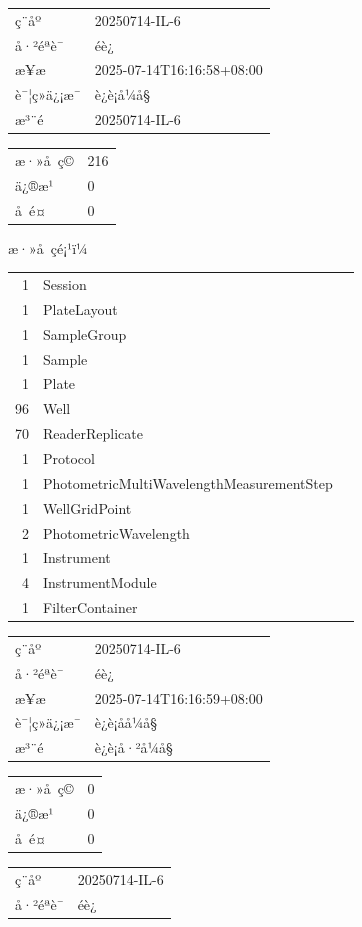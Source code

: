\documentclass[UTF8,10pt,a4paper,fontset=fandol]{ctexart}
\begin{document}
\begin{flushleft}
\scriptsize
\begin{tabular}{ll}
ç¨åº & 20250714-IL-6\\
å·²éªè¯ & éè¿\\
æ¥æ & 2025-07-14T16:16:58+08:00\\
è¯¦ç»ä¿¡æ¯ & è¿è¡å¼å§\\
æ³¨é & 20250714-IL-6
\end{tabular}

\vspace{0.5em}

\begin{tabular}{ll}
æ·»å ç© & 216\\
ä¿®æ¹ & 0\\
å é¤ & 0
\end{tabular}

\vspace{0.5em}

æ·»å çé¡¹ï¼
\begin{tabular}{rll}
1 & Session\\
1 & PlateLayout\\
1 & SampleGroup\\
1 & Sample\\
1 & Plate\\
96 & Well\\
70 & ReaderReplicate\\
1 & Protocol\\
1 & PhotometricMultiWavelengthMeasurementStep\\
1 & WellGridPoint\\
2 & PhotometricWavelength\\
1 & Instrument\\
4 & InstrumentModule\\
1 & FilterContainer
\end{tabular}

\vspace{0.8em}

\begin{tabular}{ll}
ç¨åº & 20250714-IL-6\\
å·²éªè¯ & éè¿\\
æ¥æ & 2025-07-14T16:16:59+08:00\\
è¯¦ç»ä¿¡æ¯ & è¿è¡åå¼å§\\
æ³¨é & è¿è¡å·²å¼å§
\end{tabular}

\vspace{0.5em}

\begin{tabular}{ll}
æ·»å ç© & 0\\
ä¿®æ¹ & 0\\
å é¤ & 0
\end{tabular}

\vspace{0.8em}

\begin{tabular}{ll}
ç¨åº & 20250714-IL-6\\
å·²éªè¯ & éè¿
\end{tabular}
\end{flushleft}
\end{document}
